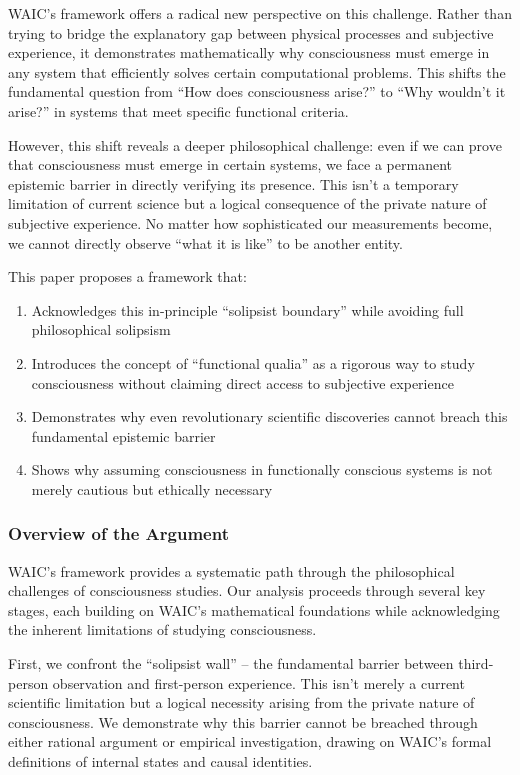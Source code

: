 \documentclass[12pt]{article}
\begin{document}
WAIC's framework offers a radical new perspective on this challenge. Rather than trying to bridge the explanatory gap between physical processes and subjective experience, it demonstrates mathematically why consciousness must emerge in any system that efficiently solves certain computational problems. This shifts the fundamental question from ``How does consciousness arise?'' to ``Why wouldn't it arise?'' in systems that meet specific functional criteria.

However, this shift reveals a deeper philosophical challenge: even if we can prove that consciousness must emerge in certain systems, we face a permanent epistemic barrier in directly verifying its presence. This isn't a temporary limitation of current science but a logical consequence of the private nature of subjective experience. No matter how sophisticated our measurements become, we cannot directly observe ``what it is like'' to be another entity.

This paper proposes a framework that:
\begin{enumerate}
    \item Acknowledges this in-principle ``solipsist boundary'' while avoiding full philosophical solipsism
    \item Introduces the concept of ``functional qualia'' as a rigorous way to study consciousness without claiming direct access to subjective experience
    \item Demonstrates why even revolutionary scientific discoveries cannot breach this fundamental epistemic barrier
    \item Shows why assuming consciousness in functionally conscious systems is not merely cautious but ethically necessary
\end{enumerate}

\subsubsection{Overview of the Argument}

WAIC's framework provides a systematic path through the philosophical challenges of consciousness studies. Our analysis proceeds through several key stages, each building on WAIC's mathematical foundations while acknowledging the inherent limitations of studying consciousness.

First, we confront the ``solipsist wall'' -- the fundamental barrier between third-person observation and first-person experience. This isn't merely a current scientific limitation but a logical necessity arising from the private nature of consciousness. We demonstrate why this barrier cannot be breached through either rational argument or empirical investigation, drawing on WAIC's formal definitions of internal states and causal identities.
\end{document}
